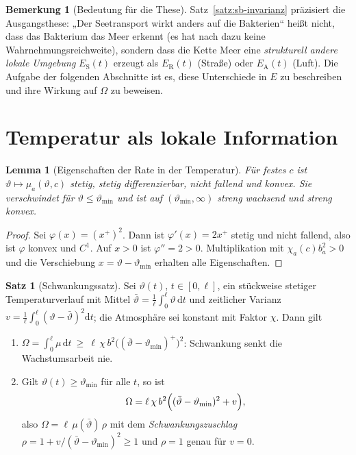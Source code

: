 \documentclass[a4paper, 12pt, twoside, openright]{report}
\newtheorem{lemma}[theorem]{Lemma}
\theoremstyle{definition}
\theoremstyle{definition}
\newtheorem{satz}{Satz}[chapter]
\newtheorem{bemerkung}{Bemerkung}[chapter]
\begin{document}
\begin{bemerkung}[Bedeutung für die These]\label{bem:sb-these}
Satz~\ref{satz:sb-invarianz} präzisiert die Ausgangsthese: „Der Seetransport wirkt anders
auf die Bakterien“ heißt nicht, dass das Bakterium das Meer erkennt (es hat nach
\cite{epp_bakterien} dazu keine Wahrnehmungsreichweite), sondern dass die Kette Meer eine
\emph{strukturell andere lokale Umgebung} $E_{\mathrm S}(t)$ erzeugt als $E_{\mathrm R}(t)$
(Straße) oder $E_{\mathrm A}(t)$ (Luft). Die Aufgabe der folgenden Abschnitte ist es, diese
Unterschiede in $E$ zu beschreiben und ihre Wirkung auf $\Omega$ zu beweisen.
\end{bemerkung}

\section{Temperatur als lokale Information}
\label{sec:sb-temp}

\begin{lemma}[Eigenschaften der Rate in der Temperatur]\label{lem:sb-konvex}
Für festes $c$ ist $\vartheta\mapsto\mu_a(\vartheta,c)$ stetig, stetig differenzierbar,
nicht fallend und konvex. Sie verschwindet für $\vartheta\le\vartheta_{\min}$ und ist auf
$(\vartheta_{\min},\infty)$ streng wachsend und streng konvex.
\end{lemma}

\begin{proof}
Sei $\varphi(x)=(x^+)^2$. Dann ist $\varphi'(x)=2x^+$ stetig und nicht fallend, also ist
$\varphi$ konvex und $C^1$. Auf $x>0$ ist $\varphi''=2>0$. Multiplikation mit
$\chi_a(c)b_a^2>0$ und die Verschiebung $x=\vartheta-\vartheta_{\min}$ erhalten alle
Eigenschaften.
\end{proof}

\begin{satz}[Schwankungssatz]\label{satz:sb-jensen}
Sei $\vartheta(t)$, $t\in[0,\ell]$, ein stückweise stetiger Temperaturverlauf mit Mittel
$\bar\vartheta=\frac1\ell\int_0^\ell\vartheta\,\mathrm dt$ und zeitlicher Varianz
$v=\frac1\ell\int_0^\ell(\vartheta-\bar\vartheta)^2\mathrm dt$; die Atmosphäre sei konstant
mit Faktor $\chi$. Dann gilt
\begin{enumerate}
  \item $\Omega=\int_0^\ell\mu\,\mathrm dt\ \ge\ \ell\,\chi\,b^2\bigl((\bar\vartheta-\vartheta_{\min})^+\bigr)^2$:
    Schwankung senkt die Wachstumsarbeit nie.
  \item Gilt $\vartheta(t)\ge\vartheta_{\min}$ für alle $t$, so ist
    \begin{equation}
      \Omega=\ell\,\chi\,b^{2}\Bigl((\bar\vartheta-\vartheta_{\min})^{2}+v\Bigr),
      \label{eq:sb-varianz}
    \end{equation}
    also $\Omega=\ell\,\mu(\bar\vartheta)\,\rho$ mit dem \emph{Schwankungszuschlag}
    $\rho=1+v/(\bar\vartheta-\vartheta_{\min})^2\ge1$ und $\rho=1$ genau für $v=0$.
\end{enumerate}
\end{satz}
\end{document}
